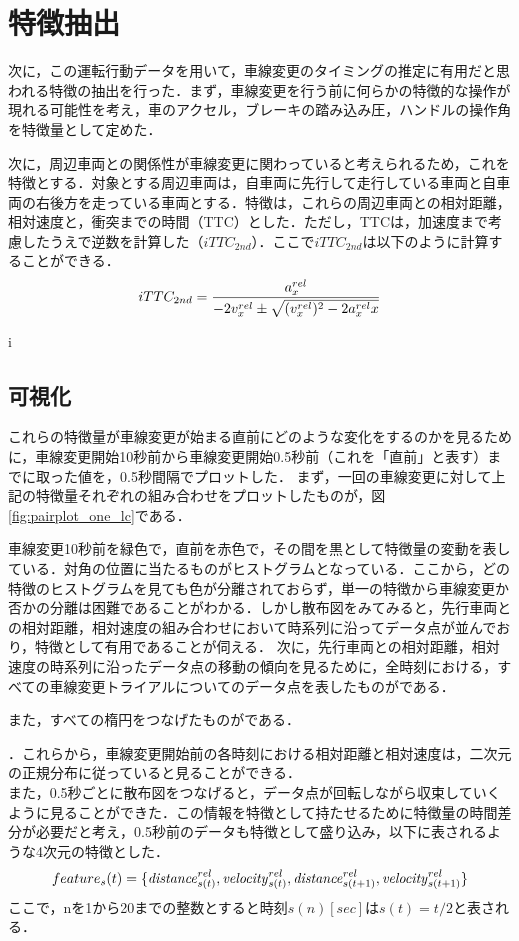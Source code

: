 \section{特徴抽出}
次に，この運転行動データを用いて，車線変更のタイミングの推定に有用だと思われる特徴の抽出を行った．まず，車線変更を行う前に何らかの特徴的な操作が現れる可能性を考え，車のアクセル，ブレーキの踏み込み圧，ハンドルの操作角を特徴量として定めた．
\par
次に，周辺車両との関係性が車線変更に関わっていると考えられるため，これを特徴とする．対象とする周辺車両は，自車両に先行して走行している車両と自車両の右後方を走っている車両とする．特徴は，これらの周辺車両との相対距離，相対速度と，衝突までの時間（TTC）とした．ただし，TTCは，加速度まで考慮したうえで逆数を計算した（$iTTC_{2nd}$）．ここで$iTTC_{2nd}$は以下のように計算することができる．
\begin{align}
  iTTC_{2nd}=\frac{a_x^{rel}}{-2v_x^{rel}\pm\sqrt{(v_x^{rel})^2-2{a_x^{rel}}x}}
\end{align}


i
\subsection{可視化}
これらの特徴量が車線変更が始まる直前にどのような変化をするのかを見るために，車線変更開始10秒前から車線変更開始0.5秒前（これを「直前」と表す）までに取った値を，0.5秒間隔でプロットした．
まず，一回の車線変更に対して上記の特徴量それぞれの組み合わせをプロットしたものが，図\ref{fig:pairplot_one_lc}である．

車線変更10秒前を緑色で，直前を赤色で，その間を黒として特徴量の変動を表している．対角の位置に当たるものがヒストグラムとなっている．ここから，どの特徴のヒストグラムを見ても色が分離されておらず，単一の特徴から車線変更か否かの分離は困難であることがわかる．しかし散布図をみてみると，先行車両との相対距離，相対速度の組み合わせにおいて時系列に沿ってデータ点が並んでおり，特徴として有用であることが伺える．
次に，先行車両との相対距離，相対速度の時系列に沿ったデータ点の移動の傾向を見るために，全時刻における，すべての車線変更トライアルについてのデータ点を表したものがである．

また，すべての楕円をつなげたものがである．

．これらから，車線変更開始前の各時刻における相対距離と相対速度は，二次元の正規分布に従っていると見ることができる．
\\
また，0.5秒ごとに散布図をつなげると，データ点が回転しながら収束していくように見ることができた．この情報を特徴として持たせるために特徴量の時間差分が必要だと考え，0.5秒前のデータも特徴として盛り込み，以下に表されるような4次元の特徴とした．
\begin{align}
  feature_s(t)=\{\mathit{distance}_{s(t)}^{rel},\mathit{velocity}_{s(t)}^{rel},\mathit{distance}_{s(t+1)}^{rel},\mathit{velocity}_{s(t+1)}^{rel}\}
\end{align}
ここで，nを1から20までの整数とすると時刻$s(n)[\mathit{sec}]$は$s(t) = t/2$と表される．
